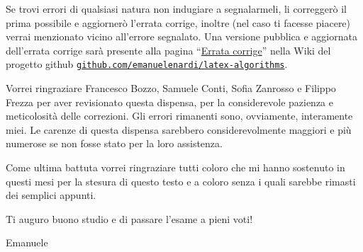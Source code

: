 Se trovi errori di qualsiasi natura non indugiare a segnalarmeli, li correggerò il prima possibile e aggiornerò l'errata corrige, inoltre (nel caso ti facesse piacere) verrai menzionato vicino all'errore segnalato.
Una versione pubblica e aggiornata dell'errata corrige sarà presente alla pagina \enquote{\href{https://github.com/emanuelenardi/latex-algorithms/wiki/Errata-corrige}{Errata corrige}} nella Wiki del progetto github \href{https://github.com/emanuelenardi/latex-algorithms/wiki/Errata-corrige}{\texttt{github.com/emanuelenardi/latex-algorithms}}.

Vorrei ringraziare Francesco Bozzo, Samuele Conti, Sofia Zanrosso e Filippo Frezza per aver revisionato questa dispensa, per la considerevole pazienza e meticolosità delle correzioni.
Gli errori rimanenti sono, ovviamente, interamente miei.
Le carenze di questa dispensa sarebbero considerevolmente maggiori e più numerose se non fosse stato per la loro assistenza.

Come ultima battuta vorrei ringraziare tutti coloro che mi hanno sostenuto in questi mesi per la stesura di questo testo e a coloro senza i quali sarebbe rimasti dei semplici appunti.

Ti auguro buono studio e di passare l'esame a pieni voti!

Emanuele
